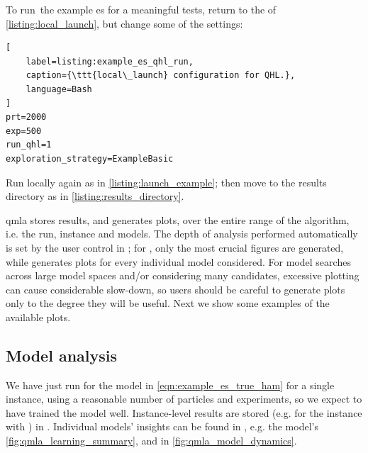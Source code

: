 To run\footnotemark \ the example \gls{es} for a meaningful tests, 
    return to the  of \cref{listing:local_launch}, 
    but change some of the settings:
\begin{lstlisting}[
    label=listing:example_es_qhl_run,
    caption={\ttt{local\_launch} configuration for QHL.},
    language=Bash
]
prt=2000
exp=500
run_qhl=1
exploration_strategy=ExampleBasic
\end{lstlisting}

Run locally again as in \cref{listing:launch_example};
    then move to the results directory as in \cref{listing:results_directory}. 
\par 
\gls{qmla} stores results, and generates plots, 
    over the entire range of the algorithm\footnotemark, i.e. the \gls{run}, \gls{instance} and models. 
The depth of analysis performed automatically is set by the user control  in ;
    for , only the most crucial figures are generated, while  generates plots for every individual 
    model considered. 
For model searches across large model spaces and/or considering many candidates,
    excessive plotting can cause considerable slow-down, so users should be careful to generate plots only 
    to the degree they will be useful. 
Next we show some examples of the available plots. 
\par 

\subsection{Model analysis}

We have just run  for the model in \cref{eqn:example_es_true_ham} for a single instance, 
    using a reasonable number of particles and experiments, so we expect to have trained the model well. 
Instance-level results are stored (e.g. for the instance with ) in .
Individual models' insights can be found in , 
    e.g. the model's  \cref{fig:qmla_learning_summary}, and  in \cref{fig:qmla_model_dynamics}.
\par 

